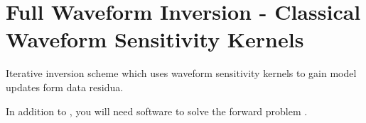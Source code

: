 \section*{Full Waveform Inversion - Classical Waveform Sensitivity Kernels} \label{guide,sec:classic_inversion}
%
%

Iterative inversion scheme which uses waveform sensitivity kernels to gain model updates form data residua.

In addition to \ASKI {}, you will need software to solve the forward 
problem .
%
